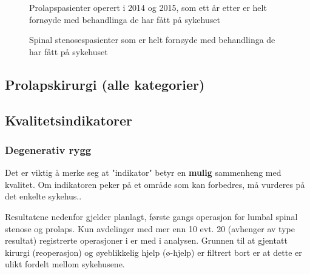 \documentclass [norsk,a4paper,twoside]{article}\usepackage[]{graphicx}\usepackage[]{color}
\begin{document}
\begin{figure}[h] 
\caption{Prolapspasienter operert i 2014 og 2015, som ett år etter er helt fornøyde med behandlinga de har fått på sykehuset}
\label{fig:FornoydAvdPro}
\end{figure}

\begin{figure}[h] 
\caption{Spinal stenosespasienter som er helt fornøyde med behandlinga de har fått på sykehuset}
\label{fig:FornoydAvdSS}
\end{figure}


\subsection{Prolapskirurgi (alle kategorier)}


      



\clearpage

\subsection{Kvalitetsindikatorer}
\subsubsection{Degenerativ rygg}

Det er viktig å merke seg at "indikator"  betyr en \textbf{mulig} sammenheng 
med kvalitet. Om indikatoren peker på et område som kan forbedres, må vurderes på det enkelte sykehus..



      
      Resultatene nedenfor gjelder planlagt, første gangs operasjon for lumbal spinal stenose og prolaps.
Kun avdelinger med mer enn 10 evt. 20 (avhenger av type resultat) registrerte operasjoner i er med i
analysen.
Grunnen til at gjentatt kirurgi (reoperasjon) og øyeblikkelig hjelp (ø-hjelp)
er filtrert bort er at dette er ulikt fordelt mellom sykehusene.
\end{document}
